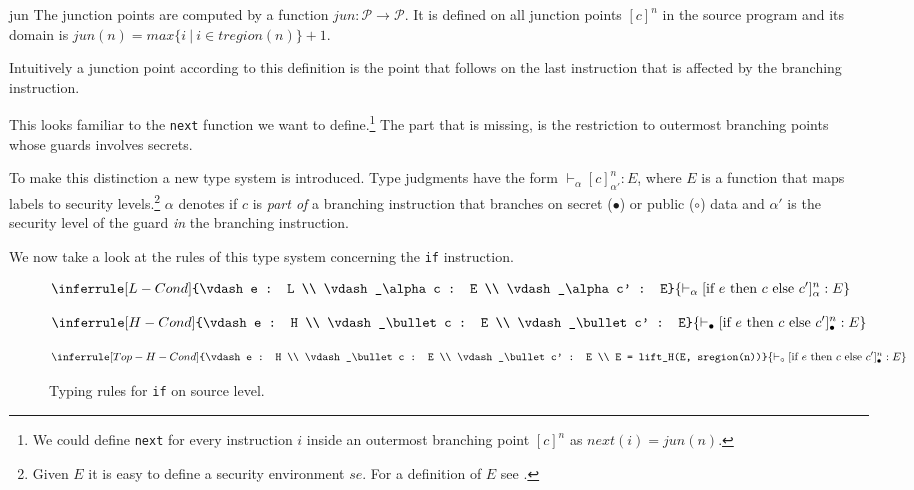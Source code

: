 \documentclass[a4paper,10pt]{llncs}
\begin{document}
\begin{definition}{jun}
The junction points are computed by a function $jun: \mathcal{P} \rightarrow \mathcal{P}$. It is defined
on all junction points $[c]^n$ in the source program and its domain is $jun(n) = max \{i\ |\ i \in tregion(n)\} + 1$.
\end{definition}

Intuitively a junction point according to this definition is the point that follows on the last instruction
that is affected by the branching instruction.

This looks familiar to the \texttt{next} function we want to define.\footnote{We could define \texttt{next} for
every instruction $i$ inside an outermost branching point $[c]^n$ as $next(i) = jun(n)$.} The part that is
missing, is the restriction to outermost branching points whose guards involves secrets.

To make this distinction a new type system is introduced. Type judgments have the form
$\vdash_\alpha [c]_{\alpha'}^n : E$, where $E$ is a function that maps labels to security
levels.\footnote{Given $E$ it is easy to define a security environment $se$. For a definition
of $E$ see \cite{Barthe06}.} $\alpha$ denotes if $c$ is \textit{part of} a branching
instruction that branches on secret ($\bullet$) or public ($\circ$) data and $\alpha'$ is the
security level of the guard \textit{in} the branching instruction.

We now take a look at the rules of this type system concerning the \texttt{if} instruction.

\begin{figure}
\begin{align*}
\inferrule[L-Cond]{\vdash e : L \\ \vdash_\alpha c : E \\ \vdash_\alpha c' : E}
{\vdash_\alpha [\text{if} \ e \ \text{then} \ c \ \text{else} \ c']^n_\alpha : E}
\end{align*}

\begin{align*}
\inferrule[H-Cond]{\vdash e : H \\ \vdash_\bullet c : E \\ \vdash_\bullet c' : E}
{\vdash_\bullet [\text{if} \ e \ \text{then} \ c \ \text{else} \ c']^n_\bullet : E}
\end{align*}

\begin{align*}
\inferrule[Top-H-Cond]{\vdash e : H \\ \vdash_\bullet c : E \\
\vdash_\bullet c' : E \\ E = lift_H(E, sregion(n))}
{\vdash_\circ [\text{if} \ e \ \text{then} \ c \ \text{else} \ c']^n_\bullet : E}
\end{align*}
\caption{Typing rules for \texttt{if} on source level.}
\label{fig:typing-rules-if}
\end{figure}
\end{document}
